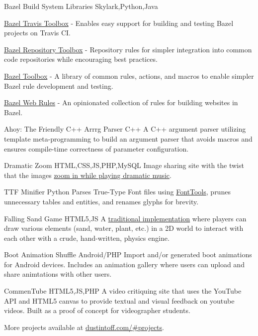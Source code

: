 \personalProject {} {Bazel Build System Libraries} {Skylark,Python,Java} {
    \begin {minimalItemize}
        \item \href {https://github.com/quittle/bazel_travis_toolbox} {Bazel Travis Toolbox} - Enables easy support for building and testing Bazel projects on Travis CI.
        \item \href {https://github.com/quittle/bazel_repository_toolbox} {Bazel Repository Toolbox} - Repository rules for simpler integration into common code repositories while encouraging best practices.
        \item \href {https://github.com/quittle/bazel_toolbox} {Bazel Toolbox} - A library of common rules, actions, and macros to enable simpler Bazel rule development and testing.
        \item \href {https://github.com/quittle/rules_web} {Bazel Web Rules} - An opinionated collection of rules for building websites in Bazel.
    \end {minimalItemize}
}

 {Ahoy: The Friendly C++ Arrrg Parser} {C++} {
    A C++ argument parser utilizing template meta-programming to build an argument parser that avoids macros and ensures compile-time correctness of parameter configuration.
}

 {Dramatic Zoom} {HTML,CSS,JS,PHP,MySQL} {
    Image sharing site with the twist that the images \href {https://youtu.be/a1Y73sPHKxw} {zoom in while playing dramatic music}.
}

\personalProject {} {TTF Minifier} {Python} {
    Parses True-Type Font files using \href {https://github.com/fonttools/fonttools} {FontTools}, prunes unnecessary tables and entities, and renames glyphs for brevity.
}

 {Falling Sand Game} {HTML5,JS} {
    A \href {https://en.wikipedia.org/wiki/Falling-sand_game} {traditional implementation} where players can draw various elements (sand, water, plant, etc.) in a 2D world to interact with each other with a crude, hand-written, physics engine.
}

 {Boot Animation Shuffle} {Android/PHP} {
    Import and/or generated boot animations for Android devices. Includes an animation gallery where users can upload and share animtations with other users.
}

 {CommenTube} {HTML5,JS,PHP} {
    A video critiquing site that uses the YouTube API and HTML5 canvas to provide textual and visual feedback on youtube videos. Built as a proof of concept for videographer students.
}

More projects available at \href {https://dustintoff.com/\#projects} {dustintoff.com/\#projects}.